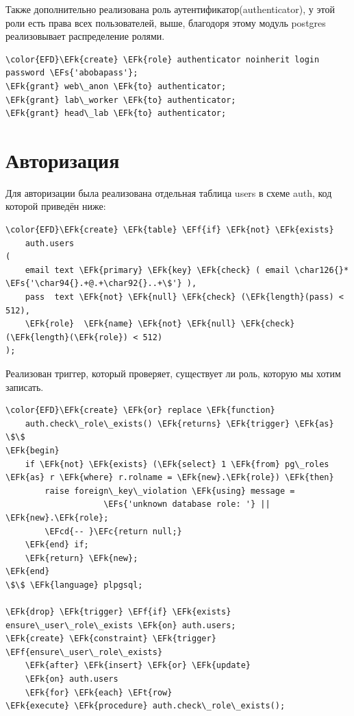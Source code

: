 \documentclass[14pt]{extarticle}
\newcommand{\EFc}[1]{\textcolor{EFc}{#1}} %
\newcommand{\EFcd}[1]{\textcolor{EFcd}{#1}} %
\newcommand{\EFs}[1]{\textcolor{EFs}{#1}} %
\newcommand{\EFk}[1]{\textcolor{EFk}{#1}} %
\newcommand{\EFf}[1]{\textcolor{EFf}{#1}} %
\newcommand{\EFt}[1]{\textcolor{EFt}{#1}} %
\begin{document}
Также дополнительно реализована роль аутентификатор(authenticator),
у этой роли есть права всех пользователей, выше, благодоря этому
модуль postgres реализовывает распределение ролями.

\begin{Code}
\begin{Verbatim}
\color{EFD}\EFk{create} \EFk{role} authenticator noinherit login password \EFs{'abobapass'};
\EFk{grant} web\_anon \EFk{to} authenticator;
\EFk{grant} lab\_worker \EFk{to} authenticator;
\EFk{grant} head\_lab \EFk{to} authenticator;
\end{Verbatim}
\end{Code}

\section{Авторизация}
\label{sec:orge4a5261}

Для авторизации была реализована отдельная таблица users в схеме auth,
код которой приведён ниже:

\begin{Code}
\begin{Verbatim}
\color{EFD}\EFk{create} \EFk{table} \EFf{if} \EFk{not} \EFk{exists}
    auth.users
(
    email text \EFk{primary} \EFk{key} \EFk{check} ( email \char126{}* \EFs{'\char94{}.+@.+\char92{}..+\$'} ),
    pass  text \EFk{not} \EFk{null} \EFk{check} (\EFk{length}(pass) < 512),
    \EFk{role}  \EFk{name} \EFk{not} \EFk{null} \EFk{check} (\EFk{length}(\EFk{role}) < 512)
);
\end{Verbatim}
\end{Code}

Реализован триггер, который проверяет,
существует ли роль, которую мы хотим записать.


\begin{Code}
\begin{Verbatim}
\color{EFD}\EFk{create} \EFk{or} replace \EFk{function}
    auth.check\_role\_exists() \EFk{returns} \EFk{trigger} \EFk{as}
\$\$
\EFk{begin}
    if \EFk{not} \EFk{exists} (\EFk{select} 1 \EFk{from} pg\_roles \EFk{as} r \EFk{where} r.rolname = \EFk{new}.\EFk{role}) \EFk{then}
        raise foreign\_key\_violation \EFk{using} message =
                    \EFs{'unknown database role: '} || \EFk{new}.\EFk{role};
        \EFcd{-- }\EFc{return null;}
    \EFk{end} if;
    \EFk{return} \EFk{new};
\EFk{end}
\$\$ \EFk{language} plpgsql;

\EFk{drop} \EFk{trigger} \EFf{if} \EFk{exists} ensure\_user\_role\_exists \EFk{on} auth.users;
\EFk{create} \EFk{constraint} \EFk{trigger} \EFf{ensure\_user\_role\_exists}
    \EFk{after} \EFk{insert} \EFk{or} \EFk{update}
    \EFk{on} auth.users
    \EFk{for} \EFk{each} \EFt{row}
\EFk{execute} \EFk{procedure} auth.check\_role\_exists();
\end{Verbatim}
\end{Code}
\end{document}
